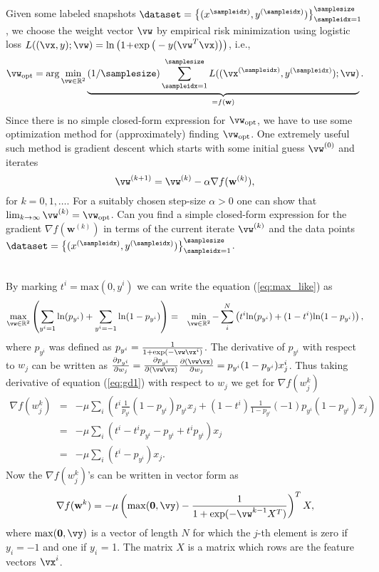 \documentclass[article,11pt]{article}
\begin{document}
Given some labeled snapshots $\dataset = \left\lbrace (x^{\sampleidx)}, y^{(\sampleidx)}) \right\rbrace_{\sampleidx=1}^{\samplesize}$, we choose the weight vector $\vw$ 
by empirical risk minimization using logistic loss $L((\vx,y); \vw) = \ln\big(1\!+\!\exp\big(- y (\vw^{T} \vx)\big)\big)$, i.e., 
\begin{equation}
\vw_{\rm opt} = \arg \min\limits_{\vw \in \mathbb{R}^{2}} \underbrace{(1/\samplesize) \sum_{\sampleidx=1}^{\samplesize} L((\vx^{(\sampleidx)},y^{(\sampleidx)}); \vw)}_{=f(\mathbf{w})}.
\end{equation} 
Since there is no simple closed-form expression for $\vw_{\rm opt}$, we have to use some optimization method for (approximately) finding $\vw_{\rm opt}$. One extremely useful such 
method is gradient descent which starts with some initial guess $\vw^{(0)}$ and iterates 
\begin{equation}
\vw^{(k+1)} = \vw^{(k)} - \alpha \nabla f(\mathbf{w}^{(k)}), 
\end{equation}
for $k=0,1,\ldots$. For a suitably chosen step-size $\alpha >0$ one can show that $\lim_{k \rightarrow \infty} \vw^{(k)} = \vw_{\rm opt}$. Can you find a simple closed-form expression 
for the gradient $\nabla f(\mathbf{w}^{(k)})$ in terms of the current iterate $\vw^{(k)}$ and the data points $\dataset = \left\lbrace (x^{(\sampleidx)}, y^{(\sampleidx)}) \right\rbrace_{\sampleidx=1}^{\samplesize}$.  

 
\\
By marking $t^i=\mathrm{max}(0,y^i)$ we can write the equation (\ref{eq:max_like}) as
\begin{eqnarray}
  \max\limits_{\vw \in \mathbb{R}^{2}}\left(\sum_{y^i=1}\mathrm{ln}(p_{y^i}) + \sum_{y^i=-1}\mathrm{ln}(1-p_{y^i})\right)&=&\min\limits_{\vw \in \mathbb{R}^{2}}-\sum_i^N\left(t^i\mathrm{ln}(p_{y^i})+(1-t^i)\mathrm{ln}(1-p_{y^i})\right),
  \label{eq:gd1}
\end{eqnarray}
where $p_{y^i}$ was defined as $p_{y^i}=\frac{1}{1+\mathrm{exp}(-\vw\vx^i)}$. The derivative of $p_{y^i}$ with respect to $w_j$ can be written as $\frac{\partial p_{y^i}}{\partial w_j}=\frac{\partial p_{y^i}}{\partial (\vw\vx)}\frac{\partial (\vw\vx)}{\partial w_j} = p_{y^i}(1-p_{y^i})x_j^i$. Thus taking derivative of equation (\ref{eq:gd1}) with
respect to $w_j$ we get for $\nabla f(w_j^k)$
\begin{eqnarray}
  \nabla f(w_j^k) &=&-\mu\sum_i\left(t^i\frac{1}{p_{y^i}}(1-p_{y^i})p_{y^i}x_j+(1-t^i)\frac{1}{1-p_{y^i}}(-1)p_{y^i}(1-p_{y^i})x_j\right)\nonumber\\
  &=&-\mu\sum_i\left(t^i -t^ip_{y^i}-p_{y^i}+t^ip_{y^i}\right)x_j\nonumber\\
  &=&-\mu\sum_i(t^i-p_{y^i})x_j.
\end{eqnarray}
Now the $\nabla f(w_j^k)$'s can be written in vector form as
\begin{equation}
  \nabla f(\mathbf{w}^k) = -\mu\left(\mathrm{max}(\mathbf{0},\vy)-\frac{1}{1+\mathrm{exp}(-\vw^{k-1} X^T)}\right)^TX,
\end{equation}
where $\mathrm{max}(\mathbf{0},\vy)$ is a vector of length $N$ for which the
$j$-th element is zero if $y_i=-1$ and one if $y_i$ = 1. The matrix $X$ is a
matrix which rows are the feature vectors $\vx^i$.
\end{document}
